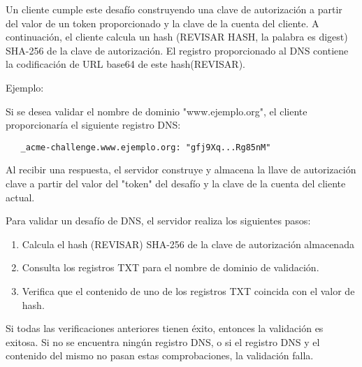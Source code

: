 Un cliente cumple este desafío construyendo una clave de autorización a partir del 
valor de un token proporcionado y la clave de la cuenta del cliente. A continuación, el 
cliente calcula un hash (REVISAR HASH, la palabra es digest) SHA-256 de la clave de 
autorización.
El registro proporcionado al DNS contiene la codificación de URL base64 de este 
hash(REVISAR). 

\noindent Ejemplo:

Si se desea validar el nombre de dominio "www.ejemplo.org", el cliente 
proporcionaría el siguiente registro DNS:

\begin{verbatim}
   _acme-challenge.www.ejemplo.org: "gfj9Xq...Rg85nM"
\end{verbatim}

Al recibir una respuesta, el servidor construye y almacena la llave de autorización
clave a partir del valor del "token" del desafío y la clave de la cuenta del cliente actual.

\noindent Para validar un desafío de DNS, el servidor realiza los siguientes pasos:

\begin{enumerate}
   \item Calcula el hash (REVISAR) SHA-256 de la clave de autorización almacenada
   \item Consulta los registros TXT para el nombre de dominio de validación.
   \item Verifica que el contenido de uno de los registros TXT coincida con el valor de hash.
\end{enumerate}

   
Si todas las verificaciones anteriores tienen éxito, entonces la validación es exitosa. 
Si no se encuentra ningún registro DNS, o si el registro DNS y el contenido del mismo 
no pasan estas comprobaciones, la validación falla.